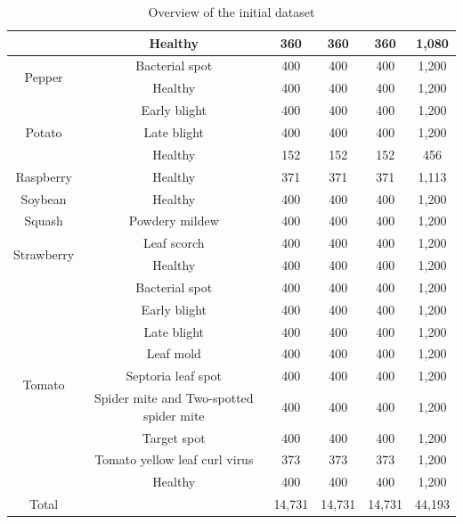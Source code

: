 \documentclass{BachelorBUI}
\begin{document}
\begin{table}[!h]
{\begin{tabular}{c|c|c|c|c|c}
                    & Healthy & 360 & 360 & 360 & 1,080 \\ \hline
                    \multirow{2}{*}{Pepper} & Bacterial spot & 400 & 400 & 400 & 1,200 \\ \cline{2-6}
                    & Healthy & 400 & 400 & 400 & 1,200 \\ \hline
                    \multirow{3}{*}{Potato} & Early blight & 400 & 400 & 400 & 1,200 \\ \cline{2-6}
                    & Late blight & 400 & 400 & 400 & 1,200 \\ \cline{2-6}
                    & Healthy & 152 & 152 & 152 & 456 \\ \hline
                    Raspberry & Healthy & 371 & 371 & 371 & 1,113 \\ \hline
                    Soybean & Healthy & 400 & 400 & 400 & 1,200 \\ \hline
                    Squash & Powdery mildew & 400 & 400 & 400 & 1,200 \\ \hline
                    \multirow{2}{*}{Strawberry} & Leaf scorch & 400 & 400 & 400 & 1,200 \\ \cline{2-6}
                    & Healthy & 400 & 400 & 400 & 1,200 \\ \hline
                    \multirow{9}{*}{Tomato} & Bacterial spot & 400 & 400 & 400 & 1,200 \\ \cline{2-6}
                    & Early blight & 400 & 400 & 400 & 1,200 \\ \cline{2-6}
                    & Late blight & 400 & 400 & 400 & 1,200 \\ \cline{2-6}
                    & Leaf mold & 400 & 400 & 400 & 1,200 \\ \cline{2-6}
                    & Septoria leaf spot & 400 & 400 & 400 & 1,200 \\ \cline{2-6}
                    & Spider mite and Two-spotted spider mite & 400 & 400 & 400 & 1,200 \\ \cline{2-6}
                    & Target spot & 400 & 400 & 400 & 1,200 \\ \cline{2-6}
                    & Tomato yellow leaf curl virus & 373 & 373 & 373 & 1,200 \\ \cline{2-6}
                    & Healthy & 400 & 400 & 400 & 1,200 \\ \hline
                    Total &  & 14,731 & 14,731 & 14,731 & 44,193 \\ \hline
                \end{tabular}
            }
            \caption{\centering Overview of the initial dataset}
            \label{tab:dataset-overview}
        \end{table}
\end{document}
